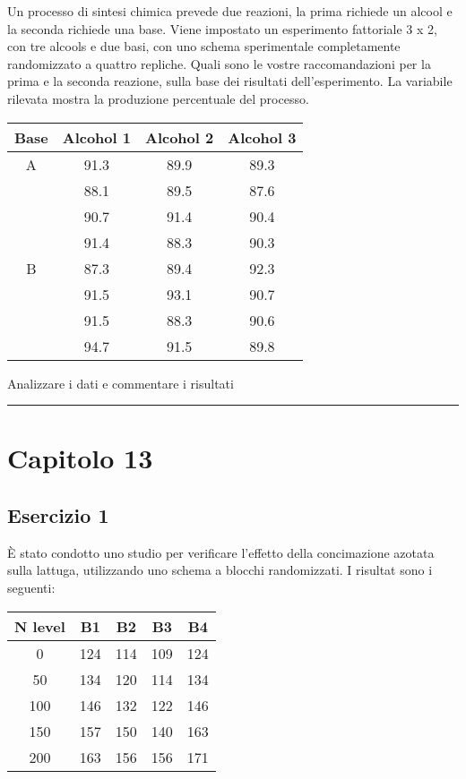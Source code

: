 \documentclass[a4paper,12pt,oneside]{book}
\begin{document}
Un processo di sintesi chimica prevede due reazioni, la prima richiede un alcool e la seconda richiede una base. Viene impostato un esperimento fattoriale 3 x 2, con tre alcools e due basi, con uno schema sperimentale completamente randomizzato a quattro repliche. Quali sono le vostre raccomandazioni per la prima e la seconda reazione, sulla base dei risultati dell'esperimento. La variabile rilevata mostra la produzione percentuale del processo.

\begin{longtable}[]{@{}cccc@{}}
\toprule
Base & Alcohol 1 & Alcohol 2 & Alcohol 3 \\
\midrule
\endhead
A & 91.3 & 89.9 & 89.3 \\
& 88.1 & 89.5 & 87.6 \\
& 90.7 & 91.4 & 90.4 \\
& 91.4 & 88.3 & 90.3 \\
B & 87.3 & 89.4 & 92.3 \\
& 91.5 & 93.1 & 90.7 \\
& 91.5 & 88.3 & 90.6 \\
& 94.7 & 91.5 & 89.8 \\
\bottomrule
\end{longtable}

Analizzare i dati e commentare i risultati

\begin{center}\rule{0.5\linewidth}{0.5pt}\end{center}

\hypertarget{capitolo-13}{%
\section{Capitolo 13}\label{capitolo-13}}

\hypertarget{esercizio-1-8}{%
\subsection{Esercizio 1}\label{esercizio-1-8}}

È stato condotto uno studio per verificare l'effetto della concimazione azotata sulla lattuga, utilizzando uno schema a blocchi randomizzati. I risultat sono i seguenti:

\begin{longtable}[]{@{}ccccc@{}}
\toprule
N level & B1 & B2 & B3 & B4 \\
\midrule
\endhead
0 & 124 & 114 & 109 & 124 \\
50 & 134 & 120 & 114 & 134 \\
100 & 146 & 132 & 122 & 146 \\
150 & 157 & 150 & 140 & 163 \\
200 & 163 & 156 & 156 & 171 \\
\bottomrule
\end{longtable}
\end{document}
